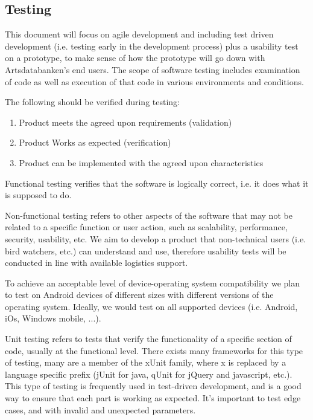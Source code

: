 
\subsection{Testing}
\label{sec:testing}

This document will focus on agile development and including test driven
development (i.e. testing early in the development process) plus a usability test on a prototype, to make sense of how the prototype will go down with Artsdatabanken's end users.  The scope of
software testing includes examination of code as well as execution of that code
in various environments and conditions.

The following should be verified during testing: \cite{wiki:software-testing}
\begin{enumerate}
	\item Product meets the agreed upon requirements (validation)
	\item Product Works as expected (verification)
	\item Product can be implemented with the agreed upon characteristics
\end{enumerate}

Functional testing verifies that the software is logically correct,
i.e. it does what it is supposed to do.

Non-functional testing refers to other aspects of the software that may not be
related to a specific function or user action, such as scalability,
performance, security, usability, etc.  We aim to develop a product that
non-technical users (i.e.  bird watchers, etc.) can understand and use,
therefore usability tests will be conducted in line with available logistics support.

To achieve an acceptable level of device-operating system compatibility we
plan to test on Android devices of different sizes with different versions of
the operating system.  Ideally, we would test on all supported devices (i.e.
Android, iOs, Windows mobile, ...).

Unit testing refers to tests that verify the functionality of a specific
section of code, usually at the functional level. There exists many frameworks for
this type of testing, many are a member of the xUnit family, where x is
replaced by a language specific prefix (jUnit for java, qUnit for jQuery and
javascript, etc.).  This type of testing is frequently used in test-driven
development, and is a good way to ensure that each part is working as expected.
It's important to test edge cases, and with invalid and unexpected parameters.

